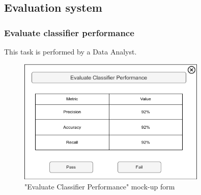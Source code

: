 \subsection{Evaluation system}

\subsubsection{Evaluate classifier performance}

This task is performed by a Data Analyst.

\begin{figure}[H]
\centering
\includegraphics[width=0.8\textwidth]{figures/evaluate_classifier_performance.png}
\caption{"Evaluate Classifier Performance" mock-up form}
\end{figure}

